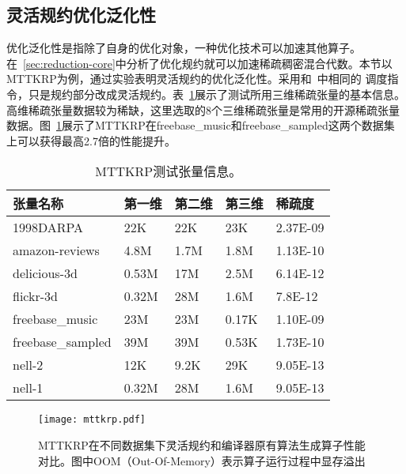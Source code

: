 \subsection{灵活规约优化泛化性}
优化泛化性是指除了自身的优化对象，一种优化技术可以加速其他算子。在~\ref{sec:reduction-core}中分析了优化规约就可以加速稀疏稠密混合代数。本节以MTTKRP为例，通过实验表明灵活规约的优化泛化性。采用和~\cite{senanayake:2020:scheduling}中相同的
调度指令，只是规约部分改成灵活规约。表~\ref{tab:tensor-info}展示了测试所用三维稀疏张量的基本信息。高维稀疏张量数据较为稀缺，这里选取的8个三维稀疏张量是常用的开源稀疏张量数据。图~\ref{fig:comp-mttkrp}展示了MTTKRP在freebase\_music和freebase\_sampled这两个数据集上可以获得最高2.7倍的性能提升。
\begin{table}
  \centering
  \caption{MTTKRP测试张量信息。}
  \begin{tabular}{lllll}
  \toprule
  张量名称& 第一维  & 第二维 & 第三维 & 稀疏度 \\
  \midrule
  1998DARPA   & 22K  & 22K & 23K  & 2.37E-09\\
  amazon-reviews   & 4.8M  & 1.7M & 1.8M  & 1.13E-10\\
  delicious-3d   & 0.53M  & 17M & 2.5M  & 6.14E-12\\
  flickr-3d   & 0.32M  & 28M & 1.6M  & 7.8E-12\\
  freebase\_music   & 23M  & 23M & 0.17K  & 1.10E-09\\
  freebase\_sampled   & 39M  & 39M & 0.53K  & 1.73E-10\\
  nell-2   & 12K  & 9.2K & 29K  & 9.05E-13\\
  nell-1   & 0.32M  & 28M & 1.6M  & 9.05E-13\\
  \bottomrule
  \end{tabular}
  \label{tab:tensor-info}
\end{table}
\begin{figure}[h]%
  \centering
  \texttt{[image: mttkrp.pdf]}
  \caption{MTTKRP在不同数据集下灵活规约和编译器原有算法生成算子性能对比。图中OOM（Out-Of-Memory）表示算子运行过程中显存溢出}\label{fig:comp-mttkrp}
\end{figure}